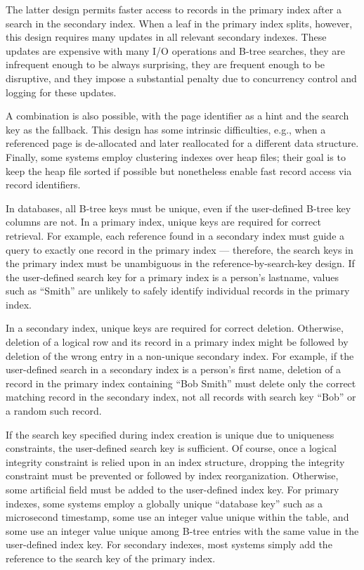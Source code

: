 The latter design permits faster access to records in the primary index
after a search in the secondary index. When a leaf in the primary index
splits, however, this design requires many updates in all relevant
secondary indexes. These updates are expensive with many I/O operations
and B-tree searches, they are infrequent enough to be always surprising,
they are frequent enough to be disruptive, and they impose a substantial
penalty due to concurrency control and logging for these updates.

A combination is also possible, with the page identifier as a hint and
the search key as the fallback. This design has some intrinsic
difficulties, e.g., when a referenced page is de-allocated and later
reallocated for a different data structure. Finally, some systems employ
clustering indexes over heap files; their goal is to keep the heap file
sorted if possible but nonetheless enable fast record access via record
identifiers.

In databases, all B-tree keys must be unique, even if the user-defined
B-tree key columns are not. In a primary index, unique keys are required
for correct retrieval. For example, each reference found in a secondary
index must guide a query to exactly one record in the primary index ---
therefore, the search keys in the primary index must be unambiguous in
the reference-by-search-key design. If the user-defined search key for a
primary index is a person's lastname, values such as ``Smith'' are unlikely
to safely identify individual records in the primary index.

In a secondary index, unique keys are required for correct deletion.
Otherwise, deletion of a logical row and its record in a primary index
might be followed by deletion of the wrong entry in a non-unique
secondary index. For example, if the user-defined search in a secondary
index is a person's first name, deletion of a record in the primary
index containing ``Bob Smith'' must delete only the correct matching
record in the secondary index, not all records with search key ``Bob''
or a random such record.

If the search key specified during index creation is unique due to
uniqueness constraints, the user-defined search key is sufficient. Of
course, once a logical integrity constraint is relied upon in an index
structure, dropping the integrity constraint must be prevented or
followed by index reorganization. Otherwise, some artificial field must
be added to the user-defined index key. For primary indexes, some
systems employ a globally unique ``database key'' such as a microsecond
timestamp, some use an integer value unique within the table, and some
use an integer value unique among B-tree entries with the same value in
the user-defined index key. For secondary indexes, most systems simply
add the reference to the search key of the primary index.

